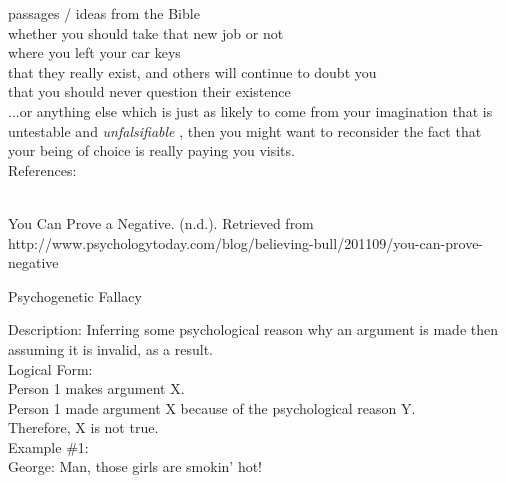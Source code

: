 \documentclass[a4paper,12pt,single,pdftex]{scrbook}
\begin{document}
    
      passages / ideas from the Bible
    \\

    
      whether you should take that new job or not
    \\

    
      where you left your car keys
    \\

    
      that they really exist, and others will continue to doubt you
    \\

    
      that you should never question their existence
    \\

    
      ...or anything else which is just as likely to come from your imagination that is untestable and {\it unfalsifiable} , then you might want to reconsider the fact that your being of choice is really paying you visits.
    \\

    References:

    
      
        
      \\

      
        
          You Can Prove a Negative. (n.d.). Retrieved from http://www.psychologytoday.com/blog/believing-bull/201109/you-can-prove-negative
        
      
    
  

Psychogenetic Fallacy
    
      Description: Inferring some psychological reason why an argument is made then assuming it is invalid, as a result.
    \\

    
      Logical Form:
    \\

    
      Person 1 makes argument X.
    \\

    
      Person 1 made argument X because of the psychological reason Y.
    \\

    
      Therefore, X is not true.
    \\

    
      Example \#1:
    \\

    
      George: Man, those girls are smokin' hot!
    \\
\end{document}
